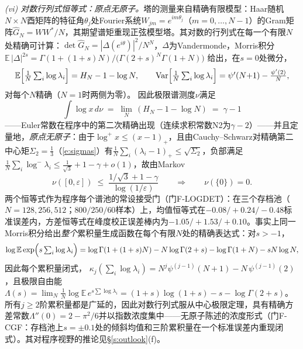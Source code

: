 \documentclass[11pt]{article}
\numberwithin{equation}{section}
\theoremstyle{definition}
\theoremstyle{remark}
\begin{document}
\emph{(vi) 对数行列式恒等式：原点无原子。}塔的测量来自精确有限模型：Haar随机$N\times N$酉矩阵的特征角$\theta_j$处Fourier系统$W_{jm}=e^{im\theta_j}$（$m=0,\dots,N{-}1$）的Gram矩阵$\widehat G_N=WW^{*}/N$，其期望谱矩重现正弦模型塔。其对数的行列式在每一个有限$N$处精确可计算：$\det\widehat G_N=|\Delta(e^{i\theta})|^{2}/N^{N}$，$\Delta$为Vandermonde，Morris积分
$\mathbb E\,|\Delta|^{2s}
=\Gamma(1+(1+s)N)\big/\bigl(\Gamma(2+s)^{N}\Gamma(1+N)\bigr)$
给出，在$s=0$处微分，
\[
\mathbb E\Bigl[\tfrac1N\textstyle\sum_i\log\lambda_i\Bigr]
= H_N-1-\log N,
\qquad
\operatorname{Var}\Bigl[\tfrac1N\textstyle\sum_i\log\lambda_i\Bigr]
= \psi'(N{+}1)-\tfrac{\psi'(2)}N ,
\]
对每个$N$精确（$N=1$时两侧为零）。
因此极限谱测度$\nu$满足
\[
\int\log x\,d\nu\;=\;\lim_{N}\,(H_N-1-\log N)\;=\;\gamma-1
\]
——Euler常数在程序中的第二次精确出现（连续求积常数N2为$\gamma-2$）——并且定量地，\emph{原点无原子}：由于$\log^{+}x\le(x-1)_{+}$，且由Cauchy--Schwarz对精确第二中心矩$\Sigma_2=\tfrac13$（\eqref{e:sigmas}）有$\tfrac1N\sum_i(\lambda_i-1)_{+}\le\sqrt{\Sigma_2}$，负部满足$\tfrac1N\sum_i\log^{-}\lambda_i\le \tfrac1{\sqrt3}+1-\gamma+o(1)$，故由Markov
\[
\nu([0,\varepsilon])\;\le\;
\frac{1/\sqrt3+1-\gamma}{\log(1/\varepsilon)}
\qquad\Longrightarrow\qquad \nu(\{0\})=0 .
\]
两个恒等式作为程序每个谱池的常设接受门（门F-LOGDET）：在三个存档池（$N=128,256,512$；$800/250/60$样本）上，均值恒等式在$-0.08/+0.24/-0.48$标准误差内，方差恒等式在峰度校正误差棒内为$-1.05/+1.53/+0.10$。事实上同一Morris积分给出\emph{整个}累积量生成函数在每个有限$N$处的精确表达式：对$s>-1$，
\[
\log\mathbb E\exp\Bigl(s\,{\textstyle\sum_i}\log\lambda_i\Bigr)
=\log\Gamma(1+(1+s)N)-N\log\Gamma(2+s)-\log\Gamma(1+N)
-sN\log N,
\]
因此每个累积量闭式，
$\kappa_j(\sum_i\log\lambda_i)
=N^{j}\psi^{(j-1)}(N+1)-N\,\psi^{(j-1)}(2)$，且极限自由能
$\Lambda(s)=\lim_N\frac1N\log\mathbb E\,e^{s\sum\log\lambda_i}
=(1+s)\log(1+s)-s-\log\Gamma(2+s)$。所有$j\ge2$阶累积量都是广延的，因此对数行列式服从中心极限定理，具有精确方差常数$\Lambda''(0)=2-\pi^{2}/6$并以指数浓度集中——无原子陈述的浓度形式（门F-CGF：存档池上$s=\pm0.1$处的倾斜均值和三阶累积量在一个标准误差内重现闭式）。其对程序视野的推论见\S\ref{s:outlook}(f)。
\end{document}
